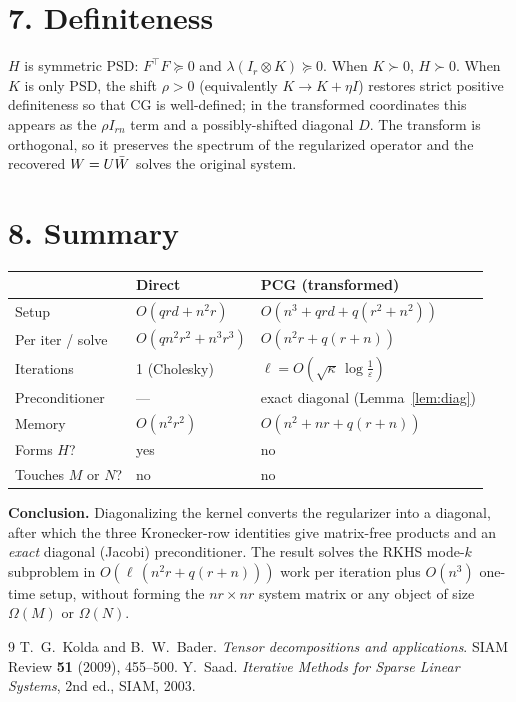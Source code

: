 \documentclass[11pt]{article}
\begin{document}
\section*{7. Definiteness}

$H$ is symmetric PSD: $F^{\!\top}F\succeq0$ and $\lambda(I_r\otimes K)\succeq0$.
When $K\succ0$, $H\succ0$. When $K$ is only PSD, the shift $\rho>0$ (equivalently
$K\to K+\eta I$) restores strict positive definiteness so that CG is
well-defined; in the transformed coordinates this appears as the
$\rho I_{rn}$ term and a possibly-shifted diagonal $D$. The transform is
orthogonal, so it preserves the spectrum of the regularized operator and the
recovered $W=U\bar W$ solves the original system.

\section*{8. Summary}

\begin{center}\small
\begin{tabular}{@{}lll@{}}\toprule
 & Direct & PCG (transformed) \\\midrule
Setup & $O(qrd+n^2r)$ & $O(n^3+qrd+q(r^2+n^2))$ \\
Per iter / solve & $O(qn^2r^2+n^3r^3)$ & $O(n^2r+q(r+n))$ \\
Iterations & 1 (Cholesky) & $\ell=O(\sqrt{\kappa}\,\log\tfrac1\varepsilon)$ \\
Preconditioner & --- & exact diagonal (Lemma~\ref{lem:diag}) \\
Memory & $O(n^2r^2)$ & $O(n^2+nr+q(r+n))$ \\
Forms $H$? & yes & no \\
Touches $M$ or $N$? & no & no \\
\bottomrule\end{tabular}\end{center}

\medskip
\noindent\textbf{Conclusion.} Diagonalizing the kernel converts the
regularizer into a diagonal, after which the three Kronecker-row identities
give matrix-free products and an \emph{exact} diagonal (Jacobi) preconditioner.
The result solves the RKHS mode-$k$ subproblem in
$O(\ell\,(n^2r+q(r+n)))$ work per iteration plus $O(n^3)$ one-time setup,
without forming the $nr\times nr$ system matrix or any object of size
$\Omega(M)$ or $\Omega(N)$.

\begin{thebibliography}{9}
 T.~G.~Kolda and B.~W.~Bader.
  \emph{Tensor decompositions and applications}.
  SIAM Review \textbf{51} (2009), 455--500.
 Y.~Saad.
  \emph{Iterative Methods for Sparse Linear Systems}, 2nd ed., SIAM, 2003.
\end{thebibliography}

\endgroup
\end{document}
